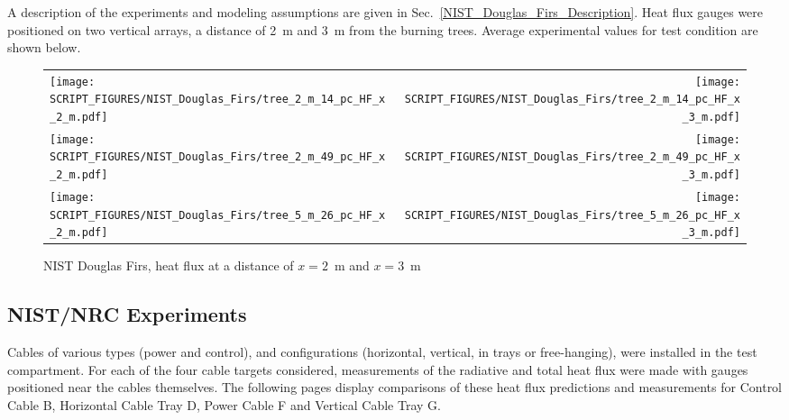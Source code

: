 A description of the experiments and modeling assumptions are given in Sec.~\ref{NIST_Douglas_Firs_Description}. Heat flux gauges were positioned on two vertical arrays, a distance of 2~m and 3~m from the burning trees. Average experimental values for test condition are shown below.

\begin{figure}[h]
\begin{tabular*}{\textwidth}{l@{\extracolsep{\fill}}r}
\texttt{[image: SCRIPT\_FIGURES/NIST\_Douglas\_Firs/tree\_2\_m\_14\_pc\_HF\_x\_2\_m.pdf]} &
\texttt{[image: SCRIPT\_FIGURES/NIST\_Douglas\_Firs/tree\_2\_m\_14\_pc\_HF\_x\_3\_m.pdf]} \\
\texttt{[image: SCRIPT\_FIGURES/NIST\_Douglas\_Firs/tree\_2\_m\_49\_pc\_HF\_x\_2\_m.pdf]} &
\texttt{[image: SCRIPT\_FIGURES/NIST\_Douglas\_Firs/tree\_2\_m\_49\_pc\_HF\_x\_3\_m.pdf]} \\
\texttt{[image: SCRIPT\_FIGURES/NIST\_Douglas\_Firs/tree\_5\_m\_26\_pc\_HF\_x\_2\_m.pdf]} &
\texttt{[image: SCRIPT\_FIGURES/NIST\_Douglas\_Firs/tree\_5\_m\_26\_pc\_HF\_x\_3\_m.pdf]}
\end{tabular*}
\caption[NIST Douglas Firs, heat flux]{NIST Douglas Firs, heat flux at a distance of $x=2$~m and $x=3$~m}
\label{NIST_Douglas_Firs_HF}
\end{figure}


\clearpage

\subsection{NIST/NRC Experiments}

Cables of various types (power and control), and configurations (horizontal, vertical, in trays or free-hanging), were installed in the test compartment. For each of the four cable targets considered, measurements of the radiative and total heat flux were made with gauges positioned near the cables themselves.  The following pages display comparisons of these heat flux predictions and measurements for Control Cable B, Horizontal Cable Tray D, Power Cable F and Vertical Cable Tray G.

\newpage

